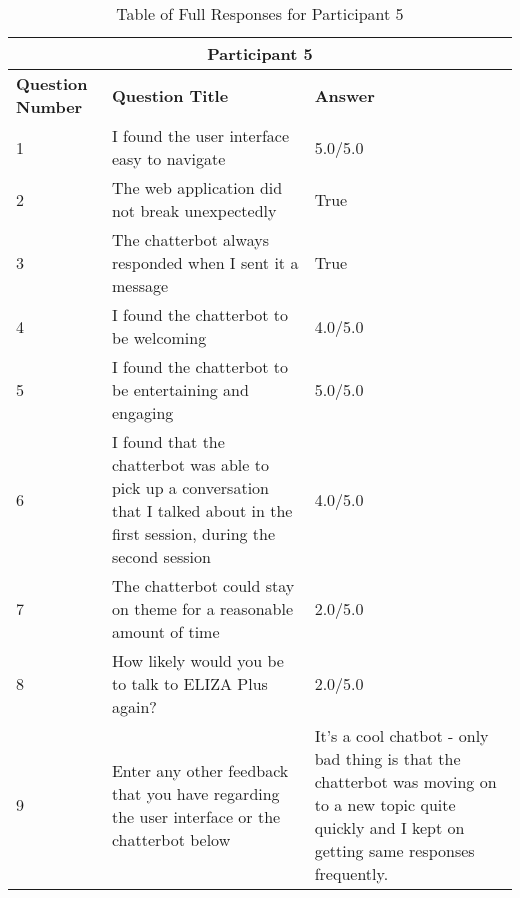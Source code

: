 \begin{table}[H]
	\centering
	\begin{tabular}{ |m{1.8cm}|m{6.5cm}| m{7cm}|} 
		\hline
		\multicolumn{3}{|c|}{Participant 5} \\
		\hline
		\textbf{Question Number} & \textbf{Question Title} & \textbf{Answer}\\ 
		\hline
		1 & I found the user interface easy to navigate & 5.0/5.0\\ 
		\hline
		2 & 
		The web application did not break unexpectedly & True \\ 
		\hline
		3 & The chatterbot always responded when I sent it a message & True\\
		\hline 
		4 & I found the chatterbot to be welcoming & 4.0/5.0\\
		\hline
		5 & I found the chatterbot to be entertaining and engaging & 5.0/5.0\\
		\hline
		6 & I found that the chatterbot was able to pick up a conversation that I talked about in the first session, during the second session  & 4.0/5.0\\
		\hline
		7 & The chatterbot could stay on theme for a reasonable amount of time & 2.0/5.0 \\
		\hline
		8 & 
		How likely would you be to talk to ELIZA Plus again? & 2.0/5.0\\
		\hline
		9 & 
		Enter any other feedback that you have regarding the user interface or the chatterbot below & It's a cool chatbot - only bad thing is that the chatterbot was moving on to a new topic quite quickly and I kept on getting same responses frequently.\\
		\hline
	\end{tabular}
	\caption{Table of Full Responses for Participant 5}
\end{table}
